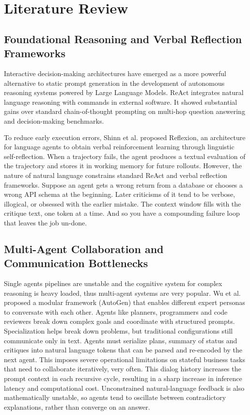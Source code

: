 \documentclass[a4paper, 12pt]{report}
\begin{document}
\chapter{Literature Review}
\fi

\label{chap.2}
\section{Foundational Reasoning and Verbal Reflection Frameworks}
Interactive decision-making architectures have emerged as a more powerful alternative to static prompt generation in the development of autonomous reasoning systems powered by Large Language Models. ReAct integrates natural language reasoning with commands in external software. It showed substantial gains over standard chain-of-thought prompting on multi-hop question answering and decision-making benchmarks.

To reduce early execution errors, Shinn et al. \cite{shinn2023reflexion} proposed Reflexion, an architecture for language agents to obtain verbal reinforcement learning through linguistic self-reflection. When a trajectory fails, the agent produces a textual evaluation of the trajectory and stores it in working memory for future rollouts. However, the nature of natural language constrains standard ReAct and verbal reflection frameworks. Suppose an agent gets a wrong return from a database or chooses a wrong API schema at the beginning. Later criticisms of it tend to be verbose, illogical, or obsessed with the earlier mistake. The context window fills with the critique text, one token at a time. And so you have a compounding failure loop that leaves the job un-done.

\section{Multi-Agent Collaboration and Communication Bottlenecks}
Single agents pipelines are unstable and the cognitive system for complex reasoning is heavy loaded, thus multi-agent systems are very popular. Wu et al. \cite{wu2023autogen} proposed a modular framework (AutoGen) that enables different expert personas to conversate with each other. Agents like planners, programmers and code reviewers break down complex goals and coordinate with structured prompts. Specialization helps break down problems, but traditional configurations still communicate only in text. Agents must serialize plans, summary of status and critiques into natural language tokens that can be parsed and re-encoded by the next agent. This imposes severe operational limitations on stateful business tasks that need to collaborate iteratively, very often. This dialog history increases the prompt context in each recursive cycle, resulting in a sharp increase in inference latency and computational cost. Unconstrained natural-language feedback is also mathematically unstable, so agents tend to oscillate between contradictory explanations, rather than converge on an answer.
\end{document}
